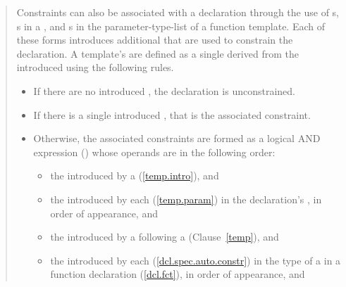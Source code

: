 \begin{quote}
\begin{addedblock}

\pnum
Constraints can also be associated with a declaration through the use of 
s, 
s in a 
, and
s in the parameter-type-list
of a function template.
% 
Each of these forms introduces additional  
that are used to constrain the declaration.
% 
A template's  are defined as a 
single  derived from the
introduced  using the
following rules.

\begin{itemize}
\item If there are no introduced ,
the declaration is unconstrained.

\item If there is a single introduced ,
that is the associated constraint.

\item Otherwise, the associated constraints are formed as a logical 
AND expression () whose operands are in the following order:
% 
\begin{itemize}
\item the  introduced by
      a  (\ref{temp.intro}), and

\item the  introduced by each
       (\ref{temp.param}) in the 
      declaration's , in
      order of appearance, and

\item the  introduced
      by a  following a 
       (Clause~\ref{temp}), and

\item the  introduced by each 
       (\ref{dcl.spec.auto.constr}) 
      in the type of a  in a 
      function declaration (\ref{dcl.fct}), in order of appearance, and


\end{itemize}
\end{itemize}
\end{addedblock}
\end{quote}

